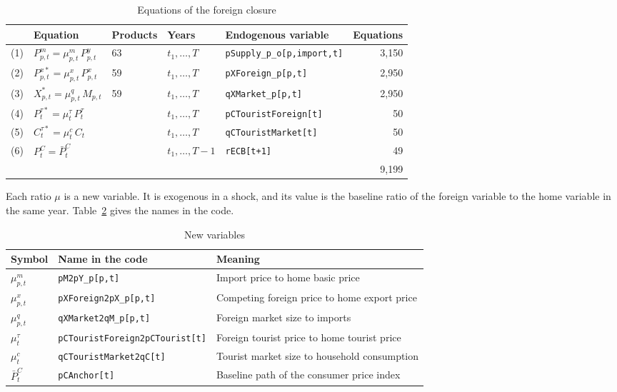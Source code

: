 \documentclass[11pt,a4paper]{article}
\newcommand{\code}[1]{\texttt{#1}}
\begin{document}
\begin{table}[H]
\centering
\small
\caption{Equations of the foreign closure}
\label{tab:equations}
\begin{tabular}{@{}lllllr@{}}
\toprule
 & Equation & Products & Years & Endogenous variable & Equations \\
\midrule
(1) & $P^{m}_{p,t} = \mu^{m}_{p,t}\, P^{y}_{p,t}$ & 63 & $t_1,\dots,T$ & \code{pSupply\_p\_o[p,import,t]} & 3{,}150 \\[2pt]
(2) & $P^{x*}_{p,t} = \mu^{x}_{p,t}\, P^{x}_{p,t}$ & 59 & $t_1,\dots,T$ & \code{pXForeign\_p[p,t]} & 2{,}950 \\[2pt]
(3) & $X^{*}_{p,t} = \mu^{q}_{p,t}\, M_{p,t}$ & 59 & $t_1,\dots,T$ & \code{qXMarket\_p[p,t]} & 2{,}950 \\[2pt]
(4) & $P^{\tau*}_{t} = \mu^{\tau}_{t}\, P^{\tau}_{t}$ & & $t_1,\dots,T$ & \code{pCTouristForeign[t]} & 50 \\[2pt]
(5) & $C^{\tau*}_{t} = \mu^{c}_{t}\, C_{t}$ & & $t_1,\dots,T$ & \code{qCTouristMarket[t]} & 50 \\[2pt]
(6) & $P^{C}_{t} = \bar{P}^{C}_{t}$ & & $t_1,\dots,T-1$ & \code{rECB[t+1]} & 49 \\
\midrule
 & & & & & 9{,}199 \\
\bottomrule
\end{tabular}
\end{table}

Each ratio $\mu$ is a new variable. It is exogenous in a shock, and its value is the baseline ratio of the foreign variable to the home variable in the same year.
Table~\ref{tab:names} gives the names in the code.

\begin{table}[H]
\centering
\small
\caption{New variables}
\label{tab:names}
\begin{tabular}{@{}lll@{}}
\toprule
Symbol & Name in the code & Meaning \\
\midrule
$\mu^{m}_{p,t}$ & \code{pM2pY\_p[p,t]} & Import price to home basic price \\
$\mu^{x}_{p,t}$ & \code{pXForeign2pX\_p[p,t]} & Competing foreign price to home export price \\
$\mu^{q}_{p,t}$ & \code{qXMarket2qM\_p[p,t]} & Foreign market size to imports \\
$\mu^{\tau}_{t}$ & \code{pCTouristForeign2pCTourist[t]} & Foreign tourist price to home tourist price \\
$\mu^{c}_{t}$ & \code{qCTouristMarket2qC[t]} & Tourist market size to household consumption \\
$\bar{P}^{C}_{t}$ & \code{pCAnchor[t]} & Baseline path of the consumer price index \\
\bottomrule
\end{tabular}
\end{table}
\end{document}
